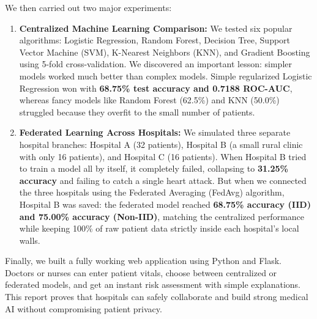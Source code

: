 \documentclass{nitathesis}
\begin{document}
We then carried out two major experiments:
\begin{enumerate}
    \item \textbf{Centralized Machine Learning Comparison:} We tested six popular algorithms: Logistic Regression, Random Forest, Decision Tree, Support Vector Machine (SVM), K-Nearest Neighbors (KNN), and Gradient Boosting using 5-fold cross-validation. We discovered an important lesson: simpler models worked much better than complex models. Simple regularized Logistic Regression won with \textbf{68.75\% test accuracy and 0.7188 ROC-AUC}, whereas fancy models like Random Forest (62.5\%) and KNN (50.0\%) struggled because they overfit to the small number of patients.
    \item \textbf{Federated Learning Across Hospitals:} We simulated three separate hospital branches: Hospital A (32 patients), Hospital B (a small rural clinic with only 16 patients), and Hospital C (16 patients). When Hospital B tried to train a model all by itself, it completely failed, collapsing to \textbf{31.25\% accuracy} and failing to catch a single heart attack. But when we connected the three hospitals using the Federated Averaging (FedAvg) algorithm, Hospital B was saved: the federated model reached \textbf{68.75\% accuracy (IID) and 75.00\% accuracy (Non-IID)}, matching the centralized performance while keeping 100\% of raw patient data strictly inside each hospital's local walls.
\end{enumerate}

Finally, we built a fully working web application using Python and Flask. Doctors or nurses can enter patient vitals, choose between centralized or federated models, and get an instant risk assessment with simple explanations. This report proves that hospitals can safely collaborate and build strong medical AI without compromising patient privacy.

\cleardoublepage
{}
{}
\tableofcontents

\cleardoublepage
{}
\setcounter{page}{1}








\cleardoublepage
{}
{}


\appendix

\end{document}
